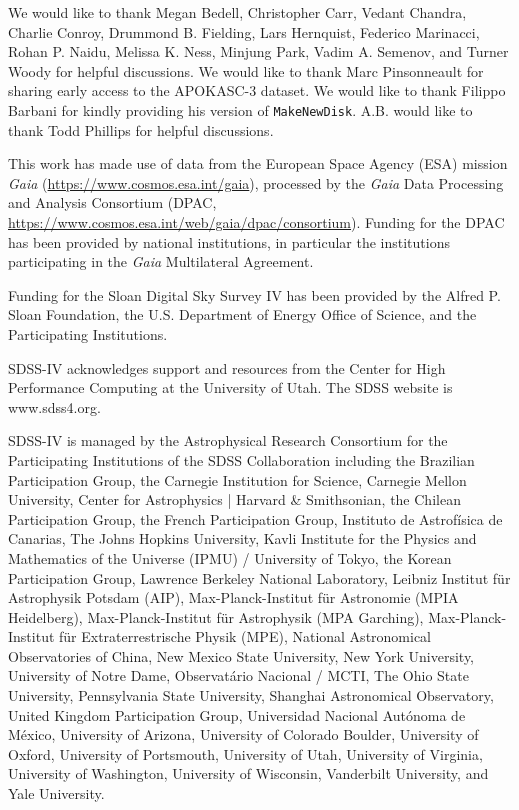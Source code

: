 \documentclass[twocolumn,linenumbers,trackchanges]{aastex631}
\begin{document}
\begin{acknowledgements}
 We would like to thank Megan Bedell, Christopher Carr, Vedant Chandra, Charlie Conroy, Drummond B. Fielding, Lars Hernquist, Federico Marinacci, Rohan P. Naidu, Melissa K. Ness, Minjung Park, Vadim A. Semenov, and Turner Woody for helpful discussions. We would like to thank Marc Pinsonneault for sharing early access to the APOKASC-3 dataset. We would like to thank Filippo Barbani for kindly providing his version of \texttt{MakeNewDisk}. A.B. would like to thank Todd Phillips for helpful discussions.

This work has made use of data from the European Space Agency (ESA) mission {\it Gaia} (\url{https://www.cosmos.esa.int/gaia}), processed by the {\it Gaia} Data Processing and Analysis Consortium (DPAC, \url{https://www.cosmos.esa.int/web/gaia/dpac/consortium}). Funding for the DPAC has been provided by national institutions, in particular the institutions participating in the {\it Gaia} Multilateral Agreement.

Funding for the Sloan Digital Sky 
Survey IV has been provided by the 
Alfred P. Sloan Foundation, the U.S. 
Department of Energy Office of 
Science, and the Participating 
Institutions. 

SDSS-IV acknowledges support and 
resources from the Center for High 
Performance Computing  at the 
University of Utah. The SDSS 
website is www.sdss4.org.

SDSS-IV is managed by the 
Astrophysical Research Consortium 
for the Participating Institutions 
of the SDSS Collaboration including 
the Brazilian Participation Group, 
the Carnegie Institution for Science, 
Carnegie Mellon University, Center for 
Astrophysics | Harvard \& 
Smithsonian, the Chilean Participation 
Group, the French Participation Group, 
Instituto de Astrof\'isica de 
Canarias, The Johns Hopkins 
University, Kavli Institute for the 
Physics and Mathematics of the 
Universe (IPMU) / University of 
Tokyo, the Korean Participation Group, 
Lawrence Berkeley National Laboratory, 
Leibniz Institut f\"ur Astrophysik 
Potsdam (AIP),  Max-Planck-Institut 
f\"ur Astronomie (MPIA Heidelberg), 
Max-Planck-Institut f\"ur 
Astrophysik (MPA Garching), 
Max-Planck-Institut f\"ur 
Extraterrestrische Physik (MPE), 
National Astronomical Observatories of 
China, New Mexico State University, 
New York University, University of 
Notre Dame, Observat\'ario 
Nacional / MCTI, The Ohio State 
University, Pennsylvania State 
University, Shanghai 
Astronomical Observatory, United 
Kingdom Participation Group, 
Universidad Nacional Aut\'onoma 
de M\'exico, University of Arizona, 
University of Colorado Boulder, 
University of Oxford, University of 
Portsmouth, University of Utah, 
University of Virginia, University 
of Washington, University of 
Wisconsin, Vanderbilt University, 
and Yale University.

\end{acknowledgements}
\end{document}
